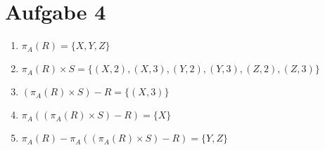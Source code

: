 \documentclass{article}
\begin{document}
	\section*{Aufgabe 4}
	\begin{enumerate}[label=(\alph*)]
		\item $\pi_A(R) = \{X,Y,Z\}$
		\item $\pi_A(R)\times S = \{(X,2),(X,3),(Y,2),(Y,3),(Z,2),(Z,3)\}$
		\item $(\pi_A(R)\times S) - R = \{(X,3)\}$
		\item $\pi_A((\pi_A(R)\times S) - R) = \{X\}$
		\item $\pi_A(R) - \pi_A((\pi_A(R)\times S) - R) = \{Y,Z\}$
	\end{enumerate}
	
\end{document}
